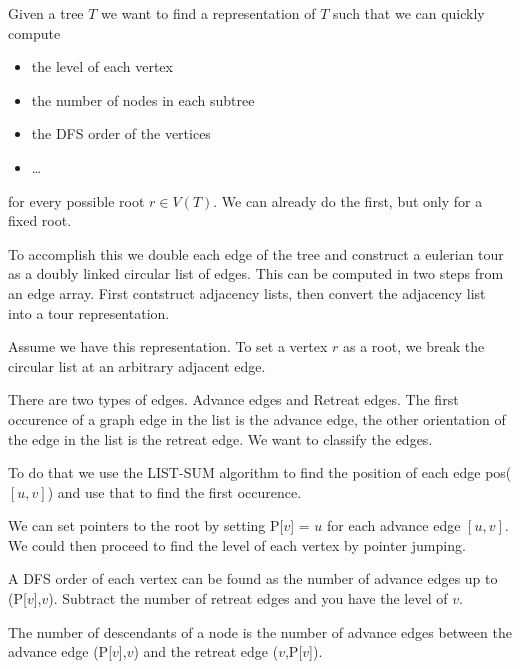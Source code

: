 Given a tree $T$ we want to find a representation of $T$ such that we can quickly compute 

\begin{itemize}
\item the level of each vertex
\item the number of nodes in each subtree
\item the DFS order of the vertices
\item \ldots
\end{itemize}

for every possible root $r\in V(T)$. We can already do the first, but only for a fixed root.

To accomplish this we double each edge of the tree and construct a eulerian tour as a doubly linked circular list of edges. This can be computed in two steps from an edge array. First contstruct adjacency lists, then convert the adjacency list into a tour representation.

Assume we have this representation. To set a vertex $r$ as a root, we break the circular list at an arbitrary adjacent edge.

There are two types of edges. Advance edges and Retreat edges. The first occurence of a graph edge in the list is the advance edge, the other orientation of the edge in the list is the retreat edge. We want to classify the edges.

To do that we use the LIST-SUM algorithm to find the position of each edge pos($[u,v]$) and use that to find the first occurence.

We can set pointers to the root by setting P[$v$] = $u$ for each advance edge $[u,v]$. We could then proceed to find the level of each vertex by pointer jumping. 

A DFS order of each vertex can be found as the number of advance edges up to (P[$v$],$v$). Subtract the number of retreat edges and you have the level of $v$.

The number of descendants of a node is the number of advance edges between the advance edge (P[$v$],$v$) and the retreat edge ($v$,P[$v$]).


